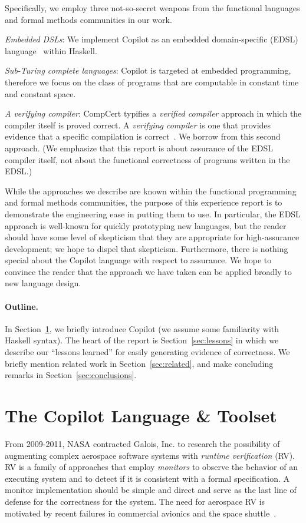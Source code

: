 \documentclass[9pt]{sigplanconf}
\begin{document}
Specifically, we employ three not-so-secret weapons from the functional languages
and formal methods communities in our work.
\begin{compactenum}
\item {\em Embedded DSLs}: We implement Copilot as an embedded domain-specific
  (EDSL) language~\cite{meijer} within Haskell.
\item {\em Sub-Turing complete languages}: Copilot is targeted at embedded
  programming, therefore we focus on the class of programs that are computable
  in constant time and constant space.
\item {\em A verifying compiler}: CompCert typifies a \emph{verified compiler}
  approach in which the compiler itself is proved correct.  A \emph{verifying
    compiler} is one that provides evidence that a specific compilation is
  correct~\cite{mcrypt}.  We borrow from this second approach.  (We emphasize
  that this report is about assurance of the EDSL compiler itself, not about the
  functional correctness of programs written in the EDSL.)
\end{compactenum}

\noindent
While the approaches we describe are known within the functional programming and
formal methods communities, the purpose of this experience report is to
demonstrate the engineering ease in putting them to use.  In particular, the
EDSL approach is well-known for quickly prototyping new languages, but the reader
should have some level of skepticism that they are appropriate for
high-assurance development; we hope to dispel that skepticism.  Furthermore,
there is nothing special about the Copilot language with respect to assurance.
We hope to convince the reader that the approach we have taken can be applied
broadly to new language design.

\paragraph{Outline.}
In Section~\ref{sec:copilot}, we briefly introduce Copilot (we assume some
familiarity with Haskell syntax).  The heart of the report is
Section~\ref{sec:lessons} in which we describe our ``lessons learned'' for
easily generating evidence of correctness.  We briefly mention related work in
Section~\ref{sec:related}, and make concluding remarks in
Section~\ref{sec:conclusions}.


\section{The Copilot Language \& Toolset}\label{sec:copilot}
From 2009-2011, NASA contracted Galois, Inc. to research the possibility of
augmenting complex aerospace software systems with \emph{runtime verification}
(RV).  RV is a family of approaches that employ \emph{monitors} to observe the
behavior of an executing system and to detect if it is consistent with a formal
specification.  A monitor implementation should be simple and direct and serve
as the last line of defense for the correctness for the system.  The need for
aerospace RV is motivated by recent failures in commercial avionics and the
space shuttle~\cite{monitors}.
\end{document}
